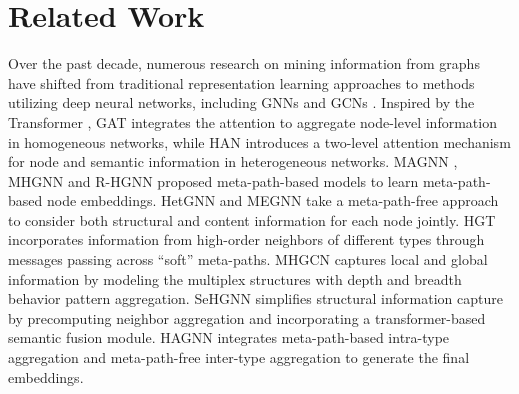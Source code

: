 \section{Related Work}

Over the past decade, numerous research on mining information from graphs have shifted from traditional representation learning approaches \cite{perozzi2014deepwalk,grover2016node2vec,dong2017metapath2vec} to methods utilizing deep neural networks, including GNNs \cite{fan2019metapath,yan2021relation,zhang23pagelink,zhu23AutoAC,SHAN24KPI-HGNN,MaYLMC24HetGPT} and GCNs \cite{kipf2016semi,liu2023rhgn}. Inspired by the Transformer \cite{vaswani2017attention}, GAT \cite{velickovic2017graph} integrates the attention to aggregate node-level information in homogeneous networks, while HAN \cite{wang2019heterogeneous} introduces a two-level attention mechanism for node and semantic information in heterogeneous networks. MAGNN \cite{fu2020magnn}, MHGNN \cite{liang2022meta} and R-HGNN \cite{yu23RHGNN} proposed meta-path-based models to learn meta-path-based node embeddings. HetGNN \cite{zhang2019heterogeneous} and MEGNN \cite{chang2022megnn} take a meta-path-free approach to consider both structural and content information for each node jointly. HGT \cite{hu2020heterogeneous} incorporates information from high-order neighbors of different types through messages passing across ``soft'' meta-paths. MHGCN \cite{fu2023multiplex} captures local and global information by modeling the multiplex structures with depth and breadth behavior pattern aggregation. SeHGNN \cite{Yang23Simple} simplifies structural information capture by precomputing neighbor aggregation and incorporating a transformer-based semantic fusion module. HAGNN \cite{zhu2023hagnn} integrates meta-path-based intra-type aggregation and meta-path-free inter-type aggregation to generate the final embeddings. 


